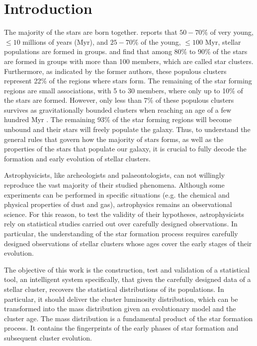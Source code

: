 \chapter{Introduction}
\label{chap:introduction}

The majority of the stars are born together. \citet{2000AJ....120.3139C} reports that $50-70\%$ of very young, $\leq10$ millions of years (Myr), and $25-70\%$ of the young, $\leq100$ Myr, stellar populations are formed in groups. \citet{2003AJ....126.1916P} and \citet{2003ARA&A..41...57L} find that among 80\% to 90\% of the stars are formed in groups with more than 100 members, which are called star clusters. Furthermore, as indicated by the former authors, these populous clusters represent 22\% of the regions where stars form. The remaining of the star forming regions are small associations, with 5 to 30 members, where only up to 10\% of the stars are formed. However, only less than 7\% of these populous clusters survives as gravitationally bounded clusters when reaching an age of a few hundred Myr \citep{2003ARA&A..41...57L}. The remaining 93\% of the star forming regions will become unbound and their stars will freely populate the galaxy. Thus, to understand the general rules that govern how the majority of stars forms, as well as the properties of the stars that populate our galaxy, it is crucial to fully decode the formation and early evolution of stellar clusters. 

Astrophysicists, like archeologists and palaeontologists, can not willingly reproduce the vast majority of their studied phenomena. Although some experiments can be performed in specific situations (e.g. the chemical and physical  properties of dust and gas), astrophysics remains an observational science. For this reason, to test the validity of their hypotheses, astrophysicists rely on statistical studies carried out over carefully designed observations. In particular, the understanding of the star formation process requires carefully designed observations of  stellar clusters whose ages cover the early stages of their evolution.

The objective of this work is the construction, test and validation of a statistical tool, an intelligent system specifically, that given the carefully designed data of a stellar cluster, recovers the statistical distributions of its populations. In particular, it should deliver the cluster luminosity distribution, which can be transformed into the mass distribution given an evolutionary model and the cluster age. The mass distribution is a fundamental product of the star formation process. It contains the fingerprints of the early phases of star formation and subsequent cluster evolution.

